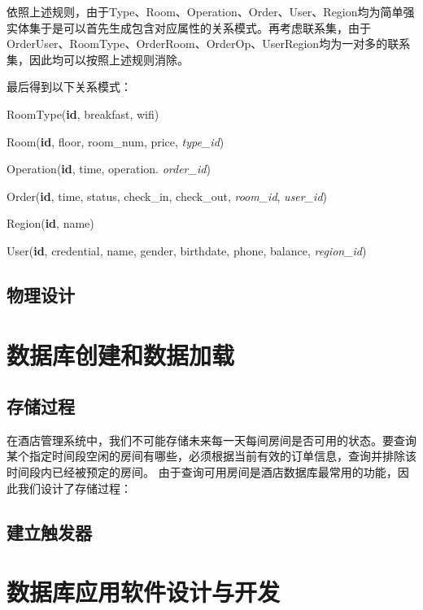 \documentclass{myreport}
\begin{document}
依照上述规则，由于Type、Room、Operation、Order、User、Region均为简单强实体集于是可以首先生成包含对应属性的关系模式。再考虑联系集，由于OrderUser、RoomType、OrderRoom、OrderOp、UserRegion均为一对多的联系集，因此均可以按照上述规则消除。

最后得到以下关系模式：

RoomType(\textbf{id}, breakfast, wifi)

Room(\textbf{id}, floor, room\_num, price, \textit{type\_id})

Operation(\textbf{id}, time, operation. \textit{order\_id})

Order(\textbf{id}, time, status, check\_in, check\_out, \textit{room\_id}, \textit{user\_id})

Region(\textbf{id}, name)

User(\textbf{id}, credential, name, gender, birthdate, phone, balance, \textit{region\_id})


\section{物理设计}

\chapter{数据库创建和数据加载}
\section{存储过程}
在酒店管理系统中，我们不可能存储未来每一天每间房间是否可用的状态。要查询某个指定时间段空闲的房间有哪些，必须根据当前有效的订单信息，查询并排除该时间段内已经被预定的房间。
由于查询可用房间是酒店数据库最常用的功能，因此我们设计了存储过程：

\section{建立触发器}


\chapter{数据库应用软件设计与开发}



% 
% 
\end{document}
